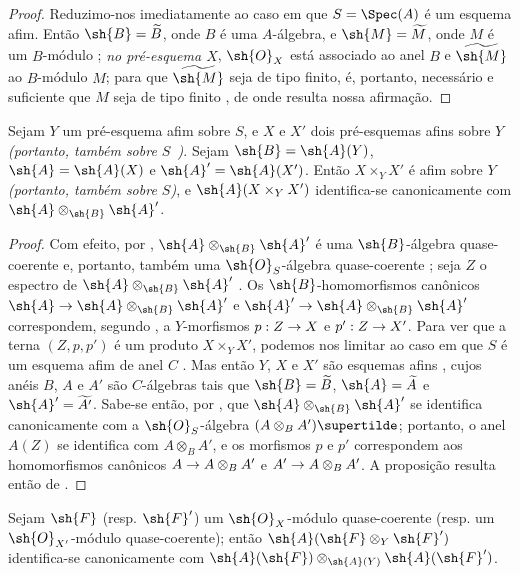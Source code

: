 \documentclass[oneside,10pt]{amsart}
\makeatletter
\newcommand{\ega@arrow}[2]{\mathchoice{#1}{#2}{#2}{#2}}
\renewcommand{\to}{\ega@arrow{\longrightarrow}{\rightarrow}}
\let\EGAOriginalLabel\label
\renewcommand{\label}[1]{\phantomsection\EGAOriginalLabel{#1}}
\makeatother
\begin{document}
\begin{proof}
Reduzimo-nos imediatamente ao caso em que $S=\Spec(A)$ é um esquema afim.
Então $\sh{B}=\widetilde{B}$, onde $B$ é uma $A$-álgebra, e $\sh{M}=\widetilde{M}$, onde $M$ é um $B$-módulo ; \emph{no pré-esquema $X$}, $\sh{O}_X$ está associado ao anel $B$ e $\widetilde{\sh{M}}$ ao $B$-módulo $M$; para que $\widetilde{\sh{M}}$ seja de tipo finito, é, portanto, necessário e suficiente que $M$ seja de tipo finito , de onde resulta nossa afirmação.
\end{proof}

\begin{proposition}[1.4.6]
\label{II.1.4.6}
Sejam $Y$ um pré-esquema afim sobre $S$, e $X$ e $X'$ dois pré-esquemas afins sobre $Y$ \emph{(portanto, também sobre $S$~)}.
Sejam $\sh{B}=\sh{A}(Y)$, $\sh{A}=\sh{A}(X)$ e $\sh{A}'=\sh{A}(X')$.
Então $X\times_Y X'$ é afim sobre $Y$ \emph{(portanto, também sobre $S$)}, e $\sh{A}(X\times_Y X')$ identifica-se canonicamente com $\sh{A}\otimes_\sh{B}\sh{A}'$.
\end{proposition}

\begin{proof}
Com efeito, por , $\sh{A}\otimes_\sh{B}\sh{A}'$ é uma $\sh{B}$-álgebra quase-coerente e, portanto, também uma $\sh{O}_S$-álgebra quase-coerente ; seja $Z$ o espectro de $\sh{A}\otimes_\sh{B}\sh{A}'$ .
Os $\sh{B}$-homomorfismos canônicos $\sh{A}\to\sh{A}\otimes_\sh{B}\sh{A}'$ e $\sh{A}'\to\sh{A}\otimes_\sh{B}\sh{A}'$ correspondem, segundo , a $Y$-morfismos $p:Z\to X$ e $p':Z\to X'$.
Para ver que a terna $(Z,p,p')$ é um produto $X\times_Y X'$, podemos nos limitar ao caso em que $S$ é um esquema afim de anel $C$ .
Mas então $Y$, $X$ e $X'$ são esquemas afins , cujos anéis $B$, $A$ e $A'$ são $C$-álgebras tais que $\sh{B}=\widetilde{B}$, $\sh{A}=\widetilde{A}$ e $\sh{A}'=\widetilde{A'}$.
Sabe-se então, por , que $\sh{A}\otimes_\sh{B}\sh{A}'$ se identifica canonicamente com a $\sh{O}_S$-álgebra $(A\otimes_B A')\supertilde$; portanto, o anel $A(Z)$ se identifica com $A\otimes_B A'$, e os morfismos $p$ e $p'$ correspondem aos homomorfismos canônicos $A\to A\otimes_B A'$ e $A'\to A\otimes_B A'$.
A proposição resulta então de .
\end{proof}

\begin{corollary}[1.4.7]
\label{II.1.4.7}
Sejam $\sh{F}$ (resp. $\sh{F}'$) um $\sh{O}_X$-módulo quase-coerente (resp. um $\sh{O}_{X'}$-módulo quase-coerente); então $\sh{A}(\sh{F}\otimes_Y\sh{F}')$ identifica-se canonicamente com $\sh{A}(\sh{F})\otimes_{\sh{A}(Y)}\sh{A}(\sh{F}')$.
\end{corollary}
\end{document}
